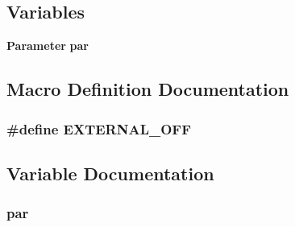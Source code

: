 \subsection*{Variables}
\begin{DoxyCompactItemize}
\item 
{\bf Parameter} {\bf par}
\end{DoxyCompactItemize}


\subsection{Macro Definition Documentation}
\subsubsection[{E\-X\-T\-E\-R\-N\-A\-L\-\_\-\-O\-F\-F}]{\setlength{\rightskip}{0pt plus 5cm}\#define E\-X\-T\-E\-R\-N\-A\-L\-\_\-\-O\-F\-F}\label{dish_8cpp_a3c638035d71663ea96aecfeea6817aa5}


\subsection{Variable Documentation}
\subsubsection[{par}]{ par}\label{dish_8cpp_aa11a52593a908c20a7259a3e72c0b348}
